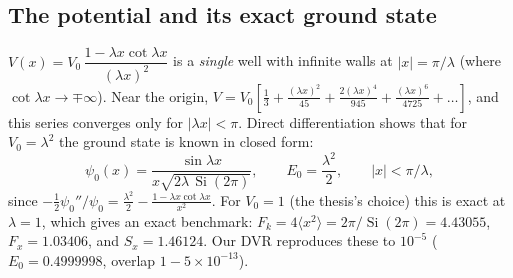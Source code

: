 \documentclass[11pt,a4paper]{article}
\newcommand{\Si}{\operatorname{Si}}
\begin{document}
\subsection{The potential and its exact ground state}
$V(x)=V_0\,\dfrac{1-\lambda x\cot\lambda x}{(\lambda x)^2}$ is a \emph{single} well with
infinite walls at $|x|=\pi/\lambda$ (where $\cot\lambda x\to\mp\infty$). Near the origin,
$V=V_0[\tfrac13+\tfrac{(\lambda x)^2}{45}+\tfrac{2(\lambda x)^4}{945}+\tfrac{(\lambda x)^6}{4725}+\dots]$,
and this series converges only for $|\lambda x|<\pi$. Direct differentiation shows that for
$V_0=\lambda^2$ the ground state is known in closed form:
\begin{equation}
\psi_0(x)=\frac{\sin\lambda x}{x\sqrt{2\lambda\,\Si(2\pi)}},\qquad E_0=\frac{\lambda^2}{2},\qquad |x|<\pi/\lambda,
\label{eq:sinc}
\end{equation}
since $-\tfrac12\psi_0''/\psi_0=\tfrac{\lambda^2}{2}-\tfrac{1-\lambda x\cot\lambda x}{x^2}$.
For $V_0=1$ (the thesis's choice) this is exact at $\lambda=1$, which gives an exact
benchmark: $F_k=4\langle x^2\rangle=2\pi/\Si(2\pi)=4.43055$, $F_x=1.03406$, and $S_x=1.46124$.
Our DVR reproduces these to $10^{-5}$ ($E_0=0.4999998$, overlap $1-5\times10^{-13}$).
\end{document}
